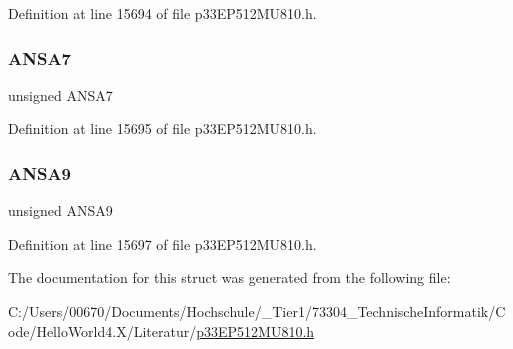 Definition at line 15694 of file p33\+E\+P512\+M\+U810.\+h.

\mbox{\label{structtag_a_n_s_e_l_a_b_i_t_s_ac1c3315a8d696abff89feb403b9f1005}} 
\subsubsection{\texorpdfstring{A\+N\+S\+A7}{ANSA7}}
{\footnotesize\ttfamily unsigned A\+N\+S\+A7}



Definition at line 15695 of file p33\+E\+P512\+M\+U810.\+h.

\mbox{\label{structtag_a_n_s_e_l_a_b_i_t_s_a653c3dbc978d1f958e63563543779e37}} 
\subsubsection{\texorpdfstring{A\+N\+S\+A9}{ANSA9}}
{\footnotesize\ttfamily unsigned A\+N\+S\+A9}



Definition at line 15697 of file p33\+E\+P512\+M\+U810.\+h.



The documentation for this struct was generated from the following file\+:\begin{DoxyCompactItemize}
\item 
C\+:/\+Users/00670/\+Documents/\+Hochschule/\+\_\+\+Tier1/73304\+\_\+\+Technische\+Informatik/\+Code/\+Hello\+World4.\+X/\+Literatur/\hyperlink{p33_e_p512_m_u810_8h}{p33\+E\+P512\+M\+U810.\+h}\end{DoxyCompactItemize}

